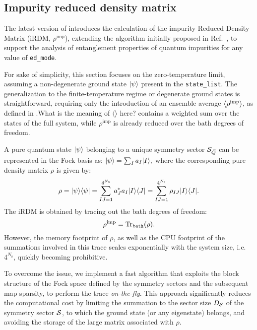 \documentclass[edipack_sp.tex]{subfiles}
\begin{document}
\subsection{Impurity reduced density matrix}\label{sSecRDM}
The latest version of \NAME introduces the calculation of the 
impurity Reduced Density Matrix (iRDM, $\rho^\mathrm{imp}$), 
extending the algorithm initially proposed in 
Ref.~, to support the analysis of entanglement 
properties of quantum impurities for any value of {\tt ed\_mode}.

For sake of simplicity, this section focuses on the zero-temperature limit, 
assuming a non-degenerate ground state $|\psi\rangle$ present in the 
{\tt state\_list}. The generalization to the finite-temperature regime 
or degenerate ground states is straightforward, requiring only the  introduction of an
ensemble average $\langle \rho^\mathrm{imp} \rangle$, as defined in 
.What is the meaning of $\langle\rangle$ here?  contains a weighted sum over the states of the full system, while $\rho^\mathrm{imp}$ is already reduced over the bath degrees of freedom.

A pure quantum state $|\psi\rangle$ belonging to a unique symmetry 
sector ${\cal S}_{\vec{Q}}$ can be represented in the Fock basis as:
$
|\psi\rangle = \sum_I a_I |I\rangle,
$
where the corresponding pure density matrix $\rho$ is given by:
\begin{equation}
\rho = |\psi\rangle\langle \psi| = \sum_{IJ=1}^{4^{N_\mathrm{s}}} 
a^*_J a_I |I\rangle\langle J| = \sum_{IJ=1}^{4^{N_\mathrm{s}}} 
\rho_{IJ} |I\rangle\langle J|.
\end{equation}
The iRDM is obtained by tracing out the bath degrees of freedom:
\begin{equation}
\rho^\mathrm{imp} = {\rm Tr}_\mathrm{bath}(\rho).
\end{equation}
However, the memory footprint of $\rho$, as well as the CPU footprint 
of the summations involved in this trace scales exponentially 
with the system size, i.e.~$4^{N_\mathrm{s}}$, quickly becoming prohibitive.

To overcome the issue, we implement a fast algorithm that exploits the 
block structure of the Fock space defined by the symmetry sectors and
the subsequent map sparsity, to perform the trace \emph{on-the-fly}. 
This approach significantly reduces the computational cost by limiting 
the summation to the sector size $D_{\cal S}$ of the symmetry sector 
${\cal S}$, to which the ground state (or any eigenstate) belongs, and avoiding
the storage of the large matrix associated with $\rho$.
\end{document}
